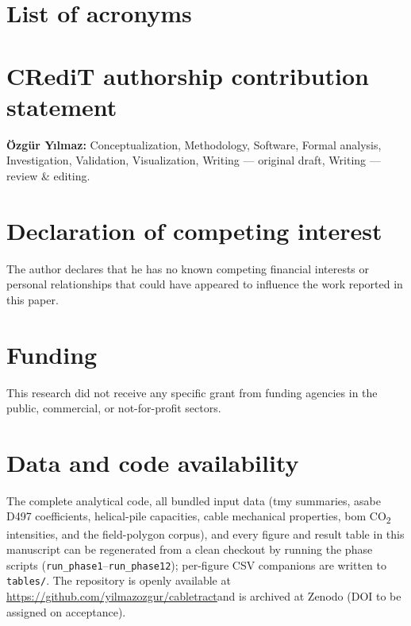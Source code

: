 \documentclass[11pt,a4paper]{article}
\newcommand{\cabletractrepo}{\url{https://github.com/yilmazozgur/cabletract}}
\begin{document}
\section{List of acronyms}\label{sec:acronyms}
\printglossary[type=\acronymtype,title={},toctitle={List of acronyms}]

\section*{CRediT authorship contribution statement}
\textbf{Özgür Yılmaz:} Conceptualization, Methodology, Software, Formal analysis, Investigation, Validation, Visualization, Writing --- original draft, Writing --- review \& editing.

\section*{Declaration of competing interest}
The author declares that he has no known competing financial interests or personal relationships that could have appeared to influence the work reported in this paper.

\section*{Funding}
This research did not receive any specific grant from funding agencies in the public, commercial, or not-for-profit sectors.

\section*{Data and code availability}
The complete analytical code, all bundled input data (\gls{tmy} summaries, \gls{asabe} D497 coefficients, helical-pile capacities, cable mechanical properties, \gls{bom} CO\textsubscript{2} intensities, and the field-polygon corpus), and every figure and result table in this manuscript can be regenerated from a clean checkout by running the phase scripts (\texttt{run\_phase1}--\texttt{run\_phase12}); per-figure CSV companions are written to \texttt{tables/}. The repository is openly available at \cabletractrepo and is archived at Zenodo (DOI to be assigned on acceptance).
\end{document}
